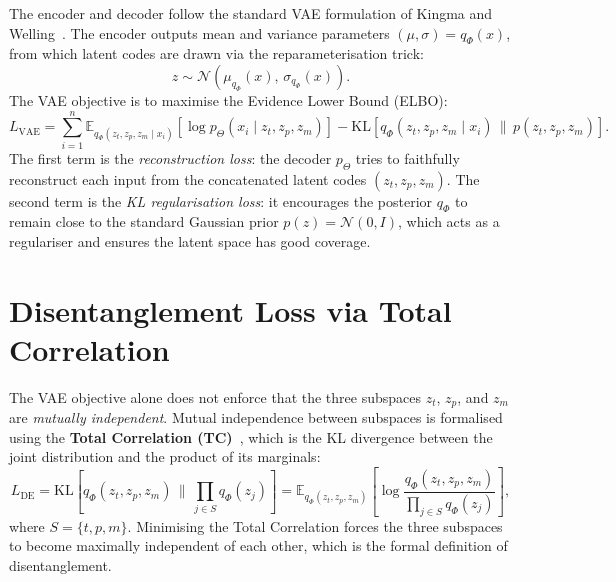 The encoder and decoder follow the standard VAE formulation of Kingma and
Welling~\cite{kingma2014vae}. The encoder outputs mean and variance parameters
$(\mu, \sigma) = q_\Phi(x)$, from which latent codes are drawn via the reparameterisation trick:
\[
    z \sim \mathcal{N}\!\left(\mu_{q_\Phi}(x),\, \sigma_{q_\Phi}(x)\right).
\]
The VAE objective is to maximise the Evidence Lower Bound (ELBO):
\begin{equation}
    L_\text{VAE} = \sum_{i=1}^{n}
        \mathbb{E}_{q_\Phi(z_t, z_p, z_m \mid x_i)}\!\left[
            \log p_\Theta(x_i \mid z_t, z_p, z_m)
        \right]
        - \mathrm{KL}\!\left[
            q_\Phi(z_t, z_p, z_m \mid x_i)
            \,\|\,
            p(z_t, z_p, z_m)
        \right].
    \label{eq:vae-elbo}
\end{equation}
The first term is the \emph{reconstruction loss}: the decoder $p_\Theta$ tries to faithfully
reconstruct each input from the concatenated latent codes $(z_t, z_p, z_m)$. The second term
is the \emph{KL regularisation loss}: it encourages the posterior $q_\Phi$ to remain close to
the standard Gaussian prior $p(z) = \mathcal{N}(0, I)$, which acts as a regulariser and ensures
the latent space has good coverage.

\section{Disentanglement Loss via Total Correlation}
\label{sec:readme-disentanglement}

The VAE objective alone does not enforce that the three subspaces $z_t$, $z_p$, and $z_m$ are
\emph{mutually independent}. Mutual independence between subspaces is formalised using the
\textbf{Total Correlation (TC)}~\cite{watanabe1960tc}, which is the KL divergence between the joint
distribution and the product of its marginals:
\begin{equation}
    L_\text{DE} = \mathrm{KL}\!\left[
        q_\Phi(z_t, z_p, z_m)
        \,\Big\|\,
        \prod_{j \in S} q_\Phi(z_j)
    \right]
    = \mathbb{E}_{q_\Phi(z_t, z_p, z_m)}\!\left[
        \log \frac{q_\Phi(z_t, z_p, z_m)}{\prod_{j \in S} q_\Phi(z_j)}
    \right],
    \label{eq:tc}
\end{equation}
where $S = \{t, p, m\}$. Minimising the Total Correlation forces the three subspaces to become
maximally independent of each other, which is the formal definition of disentanglement.

